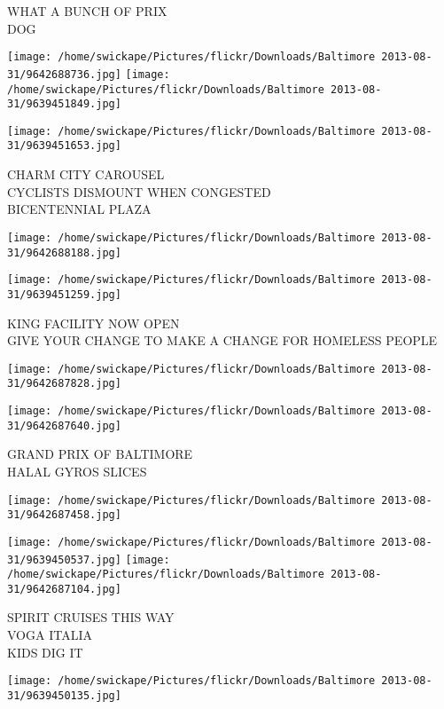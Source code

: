 \documentclass[10pt,letterpaper]{article}
\begin{document}
WHAT A BUNCH OF PRIX\\
DOG
\pagebreak

\texttt{[image: /home/swickape/Pictures/flickr/Downloads/Baltimore 2013-08-31/9642688736.jpg]}
\texttt{[image: /home/swickape/Pictures/flickr/Downloads/Baltimore 2013-08-31/9639451849.jpg]}

\texttt{[image: /home/swickape/Pictures/flickr/Downloads/Baltimore 2013-08-31/9639451653.jpg]}

CHARM CITY CAROUSEL\\
CYCLISTS DISMOUNT WHEN CONGESTED\\
BICENTENNIAL PLAZA
\pagebreak

\texttt{[image: /home/swickape/Pictures/flickr/Downloads/Baltimore 2013-08-31/9642688188.jpg]}

\vspace{0.25in}
\texttt{[image: /home/swickape/Pictures/flickr/Downloads/Baltimore 2013-08-31/9639451259.jpg]}

KING FACILITY NOW OPEN\\
GIVE YOUR CHANGE TO MAKE A CHANGE FOR HOMELESS PEOPLE
\pagebreak

\texttt{[image: /home/swickape/Pictures/flickr/Downloads/Baltimore 2013-08-31/9642687828.jpg]}

\vspace{0.25in}
\texttt{[image: /home/swickape/Pictures/flickr/Downloads/Baltimore 2013-08-31/9642687640.jpg]}

GRAND PRIX OF BALTIMORE\\
HALAL GYROS SLICES
\pagebreak

\texttt{[image: /home/swickape/Pictures/flickr/Downloads/Baltimore 2013-08-31/9642687458.jpg]}

\vspace{0.25in}
\texttt{[image: /home/swickape/Pictures/flickr/Downloads/Baltimore 2013-08-31/9639450537.jpg]}
\texttt{[image: /home/swickape/Pictures/flickr/Downloads/Baltimore 2013-08-31/9642687104.jpg]}

SPIRIT CRUISES THIS WAY\\
VOGA ITALIA\\
KIDS DIG IT
\pagebreak

\texttt{[image: /home/swickape/Pictures/flickr/Downloads/Baltimore 2013-08-31/9639450135.jpg]}
\end{document}
